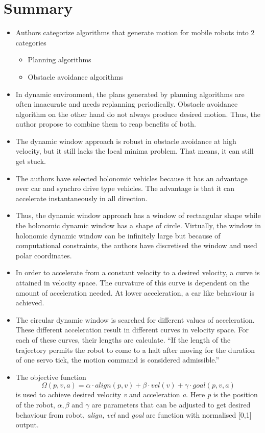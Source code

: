 \documentclass[12pt]{article}
\begin{document}
\section{Summary}
\begin{itemize}
    \item Authors categorize algorithms that generate motion for mobile robots into 2 categories
        \begin{itemize}
            \item Planning algorithms
            \item Obstacle avoidance algorithms
        \end{itemize}
    \item In dynamic environment, the plans generated by planning algorithms are often inaacurate and needs replanning periodically. Obstacle avoidance algorithm on the other hand do not always produce desired motion. Thus, the author propose to combine them to reap benefits of both.
    \item The dynamic window approach\cite{fox1997dynamic} is robust in obstacle avoidance at high velocity, but it still lacks the local minima problem. That means, it can still get stuck.
    \item The authors have selected holonomic vehicles because it has an advantage over car and synchro drive type vehicles. The advantage is that it can accelerate instantaneously in all direction.
    \item Thus, the dynamic window approach has a window of rectangular shape while the holonomic dynamic window has a shape of circle. Virtually, the window in holonomic dynamic window can be infinitely large but because of computational constraints, the authors have discretised the window and used polar coordinates.
    \item In order to accelerate from a constant velocity to a desired velocity, a curve is attained in velocity space. The curvature of this curve is dependent on the amount of acceleration needed. At lower acceleration, a car like behaviour is achieved.
    \item The circular dynamic window is searched for different values of acceleration. These different acceleration result in different curves in velocity space. For each of these curves, their lengths are calculate. ``If the length of the trajectory permits the robot to
        come to a halt after moving for the duration of one
        servo tick, the motion command is considered admissible.''\cite{brook1999high}
    \item The objective function $$\Omega(p, v, a) = \alpha \cdot align(p,v) + \beta \cdot vel(v) + \gamma \cdot goal(p,v,a)$$ is used to achieve desired velocity \textit{v} and acceleration \textit{a}. Here \textit{p} is the position of the robot, $\alpha, \beta$ and $\gamma$ are parameters that can be adjusted to get desired behaviour from robot, \textit{align, vel} and \textit{goal} are function with normalised [0,1] output.

\end{itemize}
\end{document}
